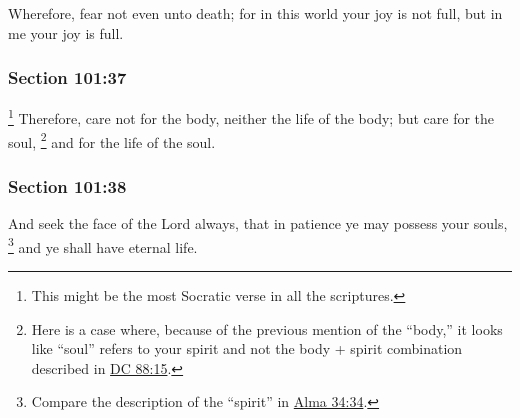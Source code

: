 		Wherefore, fear not even unto death; for in this world your joy is not full, but in me your joy is full.


	\subsubsection{Section 101:37} %
		\label{DC101-37}

			\footnote{%
				This might be the most Socratic verse in all the scriptures.
				}%
		Therefore, care not for the body, neither the life of the body; but care for the soul,%
			\footnote{%
				Here is a case where, because of the previous mention of the ``body,'' it looks like ``soul'' refers to your spirit and not the body + spirit combination described in \hyperref[DC88-15]{DC 88:15}.
				}
		and for the life of the soul.


	\subsubsection{Section 101:38} %
		\label{DC101-38}

		And seek the face of the Lord always, that in patience ye may possess your souls,%
			\footnote{%
				Compare the description of the ``spirit'' in \hyperref[ALMA-34-34]{Alma 34:34}.
				}
		and ye shall have eternal life.


